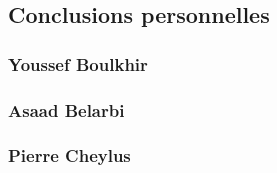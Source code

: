 \documentclass{article}
\begin{document}
    \subsection{Conclusions personnelles}
        \subsubsection{Youssef Boulkhir}
        \subsubsection{Asaad Belarbi}
        \subsubsection{Pierre Cheylus}
\end{document}
